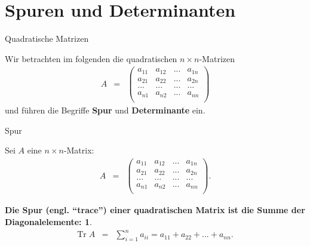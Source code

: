 \documentclass[german]{beamer}
\newcommand{\bq}{\begin{eqnarray*}}
\newcommand{\eq}{\end{eqnarray*}}
\newtheorem*{mytheorem15}{Die Spur (engl. ``trace'') einer quadratischen Matrix ist die Summe der Diagonalelemente:}
\begin{document}

\section{Spuren und Determinanten}

\frame{\sectionpage}

\begin{frame}{Quadratische Matrizen}

Wir betrachten im folgenden die \alert{quadratischen} $n\times n$-Matrizen
\bq
 A & = & 
\left( \begin{array}{cccc}
 a_{11} & a_{12} & ... & a_{1n} \\
 a_{21} & a_{22} & ... & a_{2n} \\
 ...    & ...    & ... & ...    \\
 a_{n1} & a_{n2} & ... & a_{nn} \\
\end{array} \right)
\eq
und f\"uhren die Begriffe {\bf Spur} und {\bf Determinante} ein.

\end{frame}

\begin{frame}{Spur}

Sei $A$ eine $n\times n$-Matrix:
\bq
 A & = & 
\left( \begin{array}{cccc}
 a_{11} & a_{12} & ... & a_{1n} \\
 a_{21} & a_{22} & ... & a_{2n} \\
 ...    & ...    & ... & ...    \\
 a_{n1} & a_{n2} & ... & a_{nn} \\
\end{array} \right).
\eq
\begin{mytheorem15}
\bq
\mbox{Tr}\; A & = & \sum\limits_{i=1}^n a_{ii}
 = a_{11} + a_{22} + ... + a_{nn}.
\eq
\end{mytheorem15}

\end{frame}
\end{document}
